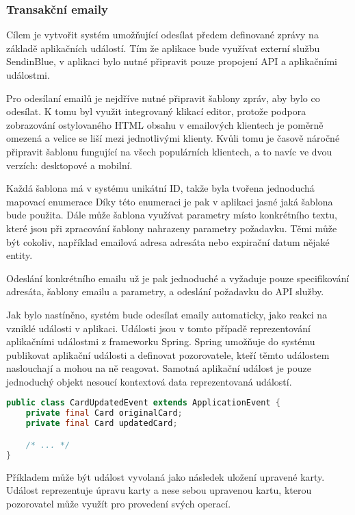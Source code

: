 		\subsubsection{Transakční emaily}

		Cílem je vytvořit systém umožňující odesílat předem definované zprávy na základě aplikačních událostí.
		Tím že aplikace bude využívat externí službu SendinBlue, v aplikaci bylo nutné připravit pouze propojení
		\ac{API} a aplikačními událostmi.

		Pro odesílaní emailů je nejdříve nutné připravit šablony zpráv, aby bylo co odesílat.
		K tomu byl využit integrovaný klikací editor, protože
		podpora zobrazování ostylovaného \ac{HTML} obsahu v
		emailových klientech je poměrně omezená a velice se liší mezi jednotlivými klienty.
		Kvůli tomu je časově náročné připravit šablonu fungující na všech populárních klientech, a to navíc ve dvou
		verzích: desktopové a mobilní.

		Každá šablona má v systému unikátní ID, takže byla tvořena jednoduchá mapovací enumerace
		Díky této enumeraci je pak v aplikaci jasné jaká šablona bude použita.
		Dále může šablona využívat parametry místo konkrétního textu, které jsou při zpracování šablony nahrazeny
		parametry požadavku.
		Těmi může být cokoliv, například emailová adresa adresáta nebo expirační datum nějaké entity.

		Odeslání konkrétního emailu už je pak jednoduché a vyžaduje pouze specifikování adresáta,
		šablony emailu a parametry, a odeslání požadavku do \ac{API} služby.

		Jak bylo nastíněno, systém bude odesílat emaily automaticky, jako reakci na vzniklé události v aplikaci.
		Události jsou v tomto případě reprezentování aplikačními událostmi z frameworku Spring.
		Spring umožňuje do systému publikovat aplikační události a definovat pozorovatele, kteří těmto událostem
		naslouchají a mohou na ně reagovat.
		Samotná aplikační událost je pouze jednoduchý objekt nesoucí kontextová data reprezentovaná událostí.

		\begin{lstlisting}[language=Java, caption={Ukázka aplikační události. Zdroj: [autor]}]
public class CardUpdatedEvent extends ApplicationEvent {
    private final Card originalCard;
    private final Card updatedCard;

    /* ... */
}
		\end{lstlisting}

		Příkladem může být událost vyvolaná jako následek uložení upravené karty.
		Událost reprezentuje úpravu karty a nese sebou upravenou kartu, kterou pozorovatel může
		využít pro provedení svých operací.

